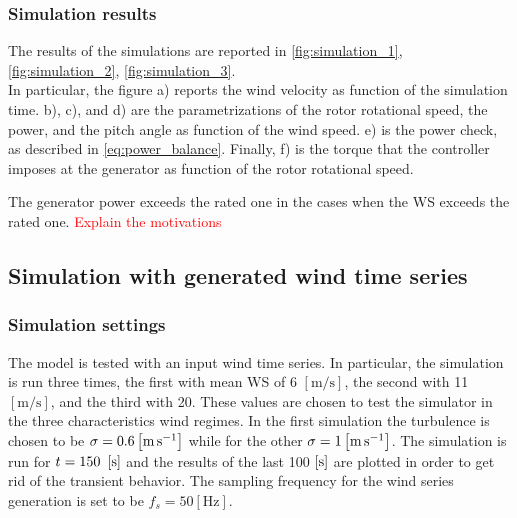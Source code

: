 \subsubsection{Simulation results}
The results of the simulations are reported in \autoref{fig:simulation_1}, \ref{fig:simulation_2}, \ref{fig:simulation_3}. \\
In particular, the figure a) reports the wind velocity as function of the simulation time. b), c), and d) are the parametrizations of the rotor rotational speed, the power, and the pitch angle as function of the wind speed. e) is the power check, as described in \autoref{eq:power_balance}. Finally, f) is the torque that the controller imposes at the generator as function of the rotor rotational speed. 


The generator power exceeds the rated one in the cases when the \acrshort{WS} exceeds the rated one. \textcolor{red}{Explain the motivations}\\

\subsection{Simulation with generated wind time series}\label{sec:wind_series_sim}
\subsubsection{Simulation settings}
The model is tested with an input wind time series. In particular, the simulation is run three times, the first with mean \acrshort{WS} of 6 $\left[\si{\meter\per\second}\right]$, the second with  11 $\left[\si{\meter\per\second}\right]$, and the third with 20. These values are chosen to test the simulator in the three characteristics wind regimes. In the first simulation the turbulence is chosen to be $\sigma=0.6 \left[\si{\meter\per\second}\right]$ while for the other $\sigma=1 \left[\si{\meter\per\second}\right]$. The simulation is run for $t=150\ \mesunt{\second}$ and the results of the last 100 $\left[\si{\second}\right]$ are plotted in order to get rid of the transient behavior. The sampling frequency for the wind series generation is set to be $f_s=50 \left[\si{\hertz}\right]$.

